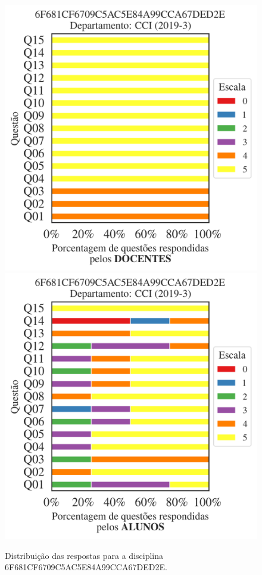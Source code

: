 \documentclass[a4paper,10pt]{article}
\begin{document}
\begin{figure}[h]
\centering
\includegraphics[width=0.485\linewidth]{analise_disciplina_departamento_CCI_6F681CF6709C5AC5E84A99CCA67DED2E_docentes.png}
\includegraphics[width=0.485\linewidth]{analise_disciplina_departamento_CCI_6F681CF6709C5AC5E84A99CCA67DED2E_alunos.png}
\caption{\label{fig:analise_geral_departamento}                Distribuição das respostas para a disciplina 6F681CF6709C5AC5E84A99CCA67DED2E. }
\end{figure}
\end{document}
